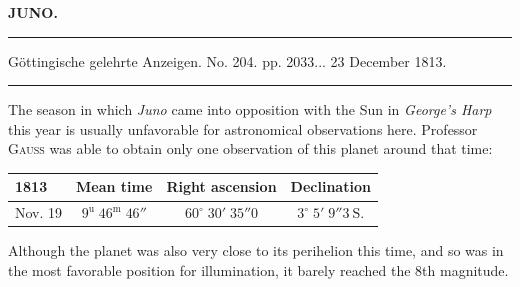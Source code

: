 \clearpage{}\hypertarget{native-377-lower}{}\label{native-377-lower}
\begin{center}\textbf{JUNO.}\par\vspace{4pt}\hrule\vspace{4pt}\fontsize{10}{12}\selectfont Göttingische gelehrte Anzeigen. No. 204. pp. 2033\;... 23 December 1813.\par\vspace{4pt}\hrule\vspace{4pt}\end{center}


\par\indent The season in which \emph{Juno} came into opposition with the Sun in \emph{George’s Harp} this year is usually unfavorable for astronomical observations here. Professor \textsc{Gauss} was able to obtain only one observation of this planet around that time:
\begin{center}\fontsize{10}{12}\selectfont\setlength{\tabcolsep}{4pt}\renewcommand{\arraystretch}{1.15}\begin{tabular}{l|c|c|c}
1813 & Mean time & Right ascension & Declination\\\hline
Nov. 19 & $9^{\mathrm u}\;46^{\mathrm m}\;46''$ & $60^\circ\;30'\;35''0$ & $3^\circ\;5'\;9''3\ \text{S.}$\\
\end{tabular}\end{center}
\par\indent Although the planet was also very close to its perihelion this time, and so was in the most favorable position for illumination, it barely reached the 8th magnitude.

